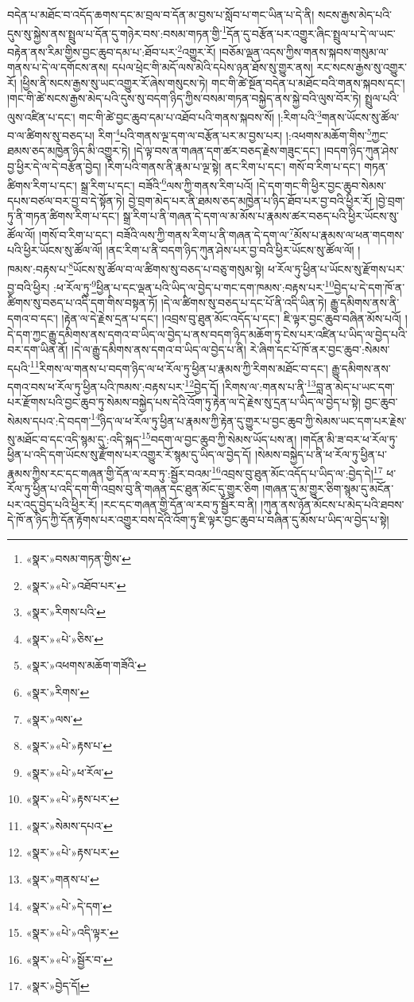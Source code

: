 བདེན་པ་མཐོང་བ་འདོད་ཆགས་དང་མ་བྲལ་བ་དོན་མ་བྱས་པ་སློབ་པ་གང་ཡིན་པ་དེ་ནི། སངས་རྒྱས་མེད་པའི་དུས་སུ་སྐྱེས་ནས་སྤྲུལ་པ་དོན་དུ་གཉེར་བས་:བསམ་གཏན་གྱི་\footnote{«སྣར་»བསམ་གཏན་གྱིས་}དོན་དུ་བརྩོན་པར་འགྱུར་ཞིང་སྤྲུལ་པ་དེ་ལ་ཡང་བརྟེན་ནས་རིམ་གྱིས་བྱང་ཆུབ་དམ་པ་:ཐོབ་པར་\footnote{«སྣར་»«པེ་»འཐོབ་པར་}འགྱུར་རོ། །བཅོམ་ལྡན་འདས་ཀྱིས་གནས་སྐབས་གསུམ་ལ་གནས་པ་དེ་ལ་དགོངས་ནས། དཔལ་ཕྲེང་གི་མདོ་ལས་མེའི་དཔེས་ཉན་ཐོས་སུ་གྱུར་ནས། རང་སངས་རྒྱས་སུ་འགྱུར་རོ། །ཕྱིས་ནི་སངས་རྒྱས་སུ་ཡང་འགྱུར་རོ་ཞེས་གསུངས་ཏེ། གང་གི་ཚེ་སྔོན་བདེན་པ་མཐོང་བའི་གནས་སྐབས་དང་། །གང་གི་ཚེ་སངས་རྒྱས་མེད་པའི་དུས་སུ་བདག་ཉིད་ཀྱིས་བསམ་གཏན་བསྐྱེད་ནས་སྐྱེ་བའི་ལུས་བོར་ཏེ། སྤྲུལ་པའི་ལུས་འཛིན་པ་དང་། གང་གི་ཚེ་བྱང་ཆུབ་དམ་པ་འཐོབ་པའི་གནས་སྐབས་སོ། །:རིག་པའི་\footnote{«སྣར་»རིགས་པའི་}གནས་ཡོངས་སུ་ཚོལ་བ་ལ་ཚིགས་སུ་བཅད་པ། རིག་\footnote{«སྣར་»«པེ་»ཅིས་}པའི་གནས་ལྔ་དག་ལ་བརྩོན་པར་མ་བྱས་པར། །:འཕགས་མཆོག་གིས་\footnote{«སྣར་»འཕགས་མཆོག་གཟོའི་}ཀྱང་ཐམས་ཅད་མཁྱེན་ཉིད་མི་འགྱུར་ཏེ། །དེ་ལྟ་བས་ན་གཞན་དག་ཚར་བཅད་རྗེས་གཟུང་དང་། །བདག་ཉིད་ཀུན་ཤེས་བྱ་ཕྱིར་དེ་ལ་དེ་བརྩོན་བྱེད། །རིག་པའི་གནས་ནི་རྣམ་པ་ལྔ་སྟེ། ནང་རིག་པ་དང་། གསོ་བ་རིག་པ་དང་། གཏན་ཚིགས་རིག་པ་དང་། སྒྲ་རིག་པ་དང་། བཟོའི་\footnote{«སྣར་»རིགས་}ལས་ཀྱི་གནས་རིག་པའོ། །དེ་དག་གང་གི་ཕྱིར་བྱང་ཆུབ་སེམས་དཔས་བཙལ་བར་བྱ་བ་དེ་སྟོན་ཏེ། བྱེ་བྲག་མེད་པར་ནི་ཐམས་ཅད་མཁྱེན་པ་ཉིད་ཐོབ་པར་བྱ་བའི་ཕྱིར་རོ། །བྱེ་བྲག་ཏུ་ནི་གཏན་ཚིགས་རིག་པ་དང་། སྒྲ་རིག་པ་ནི་གཞན་དེ་དག་ལ་མ་མོས་པ་རྣམས་ཚར་བཅད་པའི་ཕྱིར་ཡོངས་སུ་ཚོལ་ལོ། །གསོ་བ་རིག་པ་དང་། བཟོའི་ལས་ཀྱི་གནས་རིག་པ་ནི་གཞན་དེ་དག་ལ་\footnote{«སྣར་»ལས་}མོས་པ་རྣམས་ལ་ཕན་གདགས་པའི་ཕྱིར་ཡོངས་སུ་ཚོལ་ལོ། །ནང་རིག་པ་ནི་བདག་ཉིད་ཀུན་ཤེས་པར་བྱ་བའི་ཕྱིར་ཡོངས་སུ་ཚོལ་ལོ། །ཁམས་:བརྟས་པ་\footnote{«སྣར་»«པེ་»རྟས་པ་}ཡོངས་སུ་ཚོལ་བ་ལ་ཚིགས་སུ་བཅད་པ་བཅུ་གསུམ་སྟེ། ཕ་རོལ་ཏུ་ཕྱིན་པ་ཡོངས་སུ་རྫོགས་པར་བྱ་བའི་ཕྱིར། :ཕ་རོལ་ཏུ་\footnote{«སྣར་»«པེ་»ཕ་རོལ་}ཕྱིན་པ་དང་ལྡན་པའི་ཡིད་ལ་བྱེད་པ་གང་དག་ཁམས་:བརྟས་པར་\footnote{«སྣར་»«པེ་»རྟས་པར་}བྱེད་པ་དེ་དག་ཁོ་ན་ཚིགས་སུ་བཅད་པ་འདི་དག་གིས་བསྟན་ཏོ། །དེ་ལ་ཚིགས་སུ་བཅད་པ་དང་པོ་ནི་འདི་ཡིན་ཏེ། རྒྱུ་དམིགས་ནས་ནི་དགའ་བ་དང་། །རྟེན་ལ་དེ་རྗེས་དྲན་པ་དང་། །འབྲས་བུ་ཐུན་མོང་འདོད་པ་དང་། ཇི་ལྟར་བྱང་ཆུབ་བཞིན་མོས་པའོ། །དེ་དག་ཀྱང་རྒྱུ་དམིགས་ནས་དགའ་བ་ཡིད་ལ་བྱེད་པ་ནས་བདག་ཉིད་མཆོག་ཏུ་ངེས་པར་འཛིན་པ་ཡིད་ལ་བྱེད་པའི་བར་དག་ཡིན་ནོ། །དེ་ལ་རྒྱུ་དམིགས་ནས་དགའ་བ་ཡིད་ལ་བྱེད་པ་ནི། རེ་ཞིག་དང་པོ་ཁོ་ནར་བྱང་ཆུབ་:སེམས་དཔའི་\footnote{«སྣར་»སེམས་དཔའ་}རིགས་ལ་གནས་པ་བདག་ཉིད་ལ་ཕ་རོལ་ཏུ་ཕྱིན་པ་རྣམས་ཀྱི་རིགས་མཐོང་བ་དང་། རྒྱུ་དམིགས་ནས་དགའ་བས་ཕ་རོལ་ཏུ་ཕྱིན་པའི་ཁམས་:བརྟས་པར་\footnote{«སྣར་»«པེ་»རྟས་པར་}བྱེད་དོ། །རིགས་ལ་:གནས་པ་ནི་\footnote{«སྣར་»གནས་པ་}བླ་ན་མེད་པ་ཡང་དག་པར་རྫོགས་པའི་བྱང་ཆུབ་ཏུ་སེམས་བསྐྱེད་པས་དེའི་འོག་ཏུ་རྟེན་ལ་དེ་རྗེས་སུ་དྲན་པ་ཡིད་ལ་བྱེད་པ་སྟེ། བྱང་ཆུབ་སེམས་དཔའ་:དེ་བདག་\footnote{«སྣར་»«པེ་»དེ་དག་}ཉིད་ལ་ཕ་རོལ་ཏུ་ཕྱིན་པ་རྣམས་ཀྱི་རྟེན་དུ་གྱུར་པ་བྱང་ཆུབ་ཀྱི་སེམས་ཡང་དག་པར་རྗེས་སུ་མཐོང་བ་དང་འདི་སྙམ་དུ་:འདི་སྐད་\footnote{«སྣར་»«པེ་»འདི་ལྟར་}བདག་ལ་བྱང་ཆུབ་ཀྱི་སེམས་ཡོད་པས་ན། །གདོན་མི་ཟ་བར་ཕ་རོལ་ཏུ་ཕྱིན་པ་འདི་དག་ཡོངས་སུ་རྫོགས་པར་འགྱུར་རོ་སྙམ་དུ་ཡིད་ལ་བྱེད་དོ། །སེམས་བསྐྱེད་པ་ནི་ཕ་རོལ་ཏུ་ཕྱིན་པ་རྣམས་ཀྱིས་རང་དང་གཞན་གྱི་དོན་ལ་རབ་ཏུ་:སྦྱོར་བའམ་\footnote{«སྣར་»«པེ་»སྦྱོར་བ་}འབྲས་བུ་ཐུན་མོང་འདོད་པ་ཡིད་ལ་:བྱེད་དེ།\footnote{«སྣར་»བྱེད་དོ།} ཕ་རོལ་ཏུ་ཕྱིན་པ་འདི་དག་གི་འབྲས་བུ་ནི་གཞན་དང་ཐུན་མོང་དུ་གྱུར་ཅིག །གཞན་དུ་མ་གྱུར་ཅིག་སྙམ་དུ་མངོན་པར་འདུ་བྱེད་པའི་ཕྱིར་རོ། །རང་དང་གཞན་གྱི་དོན་ལ་རབ་ཏུ་སྦྱོར་བ་ནི། །ཀུན་ནས་ཉོན་མོངས་པ་མེད་པའི་ཐབས་དེ་ཁོ་ན་ཉིད་ཀྱི་དོན་རྟོགས་པར་འགྱུར་བས་དེའི་འོག་ཏུ་ཇི་ལྟར་བྱང་ཆུབ་པ་བཞིན་དུ་མོས་པ་ཡིད་ལ་བྱེད་པ་སྟེ། 